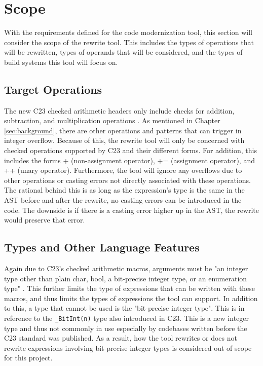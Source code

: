 \section{Scope}
\label{subsec:scope}

With the requirements defined for the code modernization tool, this section will consider the scope of the rewrite tool. This includes the types of operations that will be rewritten, types of operands that will be considered, and the types of build systems this tool will focus on.

\subsection{Target Operations}

The new C23 checked arithmetic headers only include checks for addition, subtraction, and multiplication operations \cite{ckd_arith}. As mentioned in Chapter \ref{sec:background}, there are other operations and patterns that can trigger in integer overflow. Because of this, the rewrite tool will only be concerned with checked operations supported by C23 and their different forms. For addition, this includes the forms + (non-assignment operator), += (assignment operator), and ++ (unary operator). Furthermore, the tool will ignore any overflows due to other operations or casting errors not directly associated with these operations. The rational behind this is as long as the expression's type is the same in the AST before and after the rewrite, no casting errors can be introduced in the code. The downside is if there is a casting error higher up in the AST, the rewrite would preserve that error.

\subsection{Types and Other Language Features}

Again due to C23's checked arithmetic macros, arguments must be "an integer type other than plain char, bool, a bit-precise integer type, or an enumeration type" \cite{ckd_arith}. This further limits the type of expressions that can be written with these macros, and thus limits the types of expressions the tool can support. In addition to this, a type that cannot be used is the "bit-precise integer type". This is in reference to the \texttt{\_BitInt(n)} type also introduced in C23. This is a new integer type and thus not commonly in use especially by codebases written before the C23 standard was published. As a result, how the tool rewrites or does not rewrite expressions involving bit-precise integer types is considered out of scope for this project.

